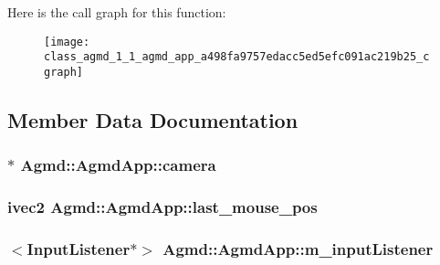 Here is the call graph for this function\+:\nopagebreak
\begin{figure}[H]
\begin{center}
\leavevmode
\texttt{[image: class\_agmd\_1\_1\_agmd\_app\_a498fa9757edacc5ed5efc091ac219b25\_cgraph]}
\end{center}
\end{figure}




\subsection{Member Data Documentation}
\hypertarget{class_agmd_1_1_agmd_app_ac44a53c44d45dfec3e73331bb80cc08e}{
\subsubsection[{camera}]{ $\ast$ Agmd\+::\+Agmd\+App\+::camera\hspace{0.3cm}{\ttfamily [protected]}}}\label{class_agmd_1_1_agmd_app_ac44a53c44d45dfec3e73331bb80cc08e}
\hypertarget{class_agmd_1_1_agmd_app_a3c65fe03cc4c00b7e3f80c913fde9d15}{
\subsubsection[{last\+\_\+mouse\+\_\+pos}]{\setlength{\rightskip}{0pt plus 5cm}ivec2 Agmd\+::\+Agmd\+App\+::last\+\_\+mouse\+\_\+pos\hspace{0.3cm}{\ttfamily [protected]}}}\label{class_agmd_1_1_agmd_app_a3c65fe03cc4c00b7e3f80c913fde9d15}
\hypertarget{class_agmd_1_1_agmd_app_a28037d91849eced08f630408c9ce1e55}{
\subsubsection[{m\+\_\+input\+Listener}]{$<${\bf Input\+Listener}$\ast$$>$ Agmd\+::\+Agmd\+App\+::m\+\_\+input\+Listener\hspace{0.3cm}{\ttfamily [protected]}}}\label{class_agmd_1_1_agmd_app_a28037d91849eced08f630408c9ce1e55}
